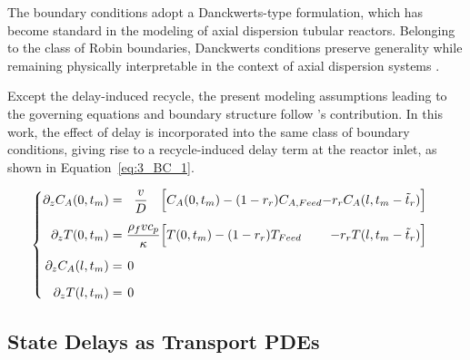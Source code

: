 The boundary conditions adopt a Danckwerts-type formulation, which has become standard in the modeling of axial dispersion tubular reactors. Belonging to the class of Robin boundaries, Danckwerts conditions preserve generality while remaining physically interpretable in the context of axial dispersion systems \autocite{Danckwerts1953Continuous}.

Except the delay-induced recycle, the present modeling assumptions leading to the governing equations and boundary structure follow 's contribution\autocite{Khatibi2021Model}. In this work, the effect of delay is incorporated into the same class of boundary conditions, giving rise to a recycle-induced delay term at the reactor inlet, as shown in Equation~\eqref{eq:3_BC_1}.

\begin{equation} \label{eq:3_BC_1}
\begin{cases}
    \begin{alignedat}{3}
        \partial_{z} C_{A}(0, t_m) &=& \dfrac{v}{D} \quad \Bigl[                           &C_{A}(0, t_m) - (1-r_r) C_{A, Feed} & - r_r C_{A}(l, t_m-\tilde{t}_r) \Bigr] & \\[1.4ex]
        \partial_{z} T(0, t_m) &=& \hspace{0.3em} \dfrac{\rho_f v c_p}{\kappa} \Bigl[ &T(0, t_m) - (1-r_r) T_{Feed} & - r_r T(l, t_m-\tilde{t}_r) \Bigr] & \\[1.4ex]
        \partial_{z} C_{A}(l, t_m) &=& 0 \hspace{0.9cm}                                    &                           &                                  & \\[1.4ex]
        \partial_{z} T(l, t_m) &=& 0 \hspace{0.9cm}                                    &                           &                                  & \\
    \end{alignedat}
\end{cases}
\end{equation}

\subsection{State Delays as Transport PDEs}

